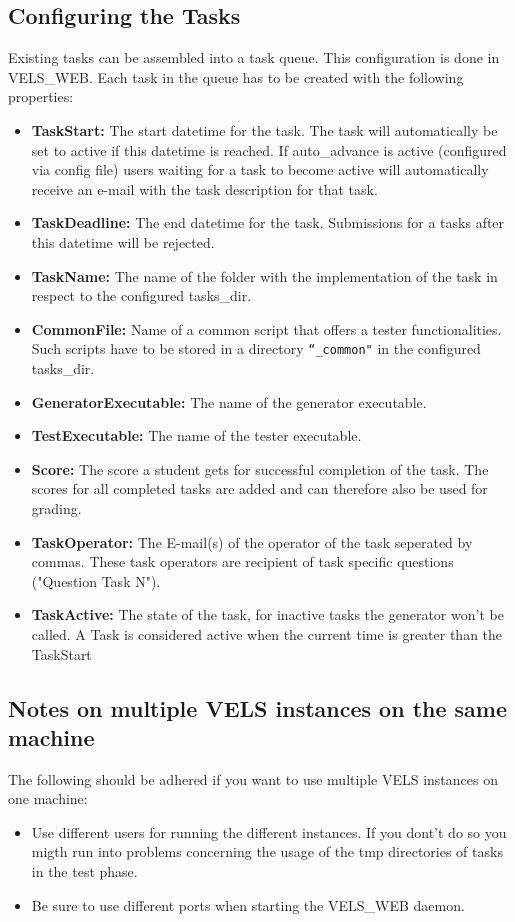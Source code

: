 \subsection{Configuring the Tasks} \label{sub:configTasks}
Existing tasks can be assembled into a task queue. This configuration is done in VELS\_WEB.
Each task in the queue has to be created with the following properties:
\begin{itemize}
\item {\bf TaskStart:} The start datetime for the task. The task will automatically
    be set to active if this datetime is reached. If auto\_advance is active (configured 
    via config file) users waiting for a task to become active will automatically 
    receive an e-mail with the task description for that task.
\item {\bf TaskDeadline:} The end datetime for the task. Submissions for a tasks after
    this datetime will be rejected.
\item {\bf TaskName:} The name of the folder with the implementation of the task in respect
	to the configured tasks\_dir.
\item {\bf CommonFile:} Name of a common script that offers a tester functionalities.
	Such scripts have to be stored in a directory {\tt ``\_common"} in the configured
	tasks\_dir.
\item {\bf GeneratorExecutable:} The name of the generator executable.
\item {\bf TestExecutable:} The name of the tester executable.
\item {\bf Score:} The score a student gets for successful completion of the task. The
    scores for all completed tasks are added and can therefore also be used for grading.
\item {\bf TaskOperator:} The E-mail(s) of the operator of the task seperated by commas. 
	These task operators are recipient of task specific questions ("Question Task N").
\item {\bf TaskActive:} The state of the task, for inactive tasks the generator won't
    be called. A Task is considered active when the current time is greater than the 
    TaskStart
\end{itemize}

\subsection{Notes on multiple VELS instances on the same machine}

The following should be adhered if you want to use multiple VELS instances on
one machine:
\begin{itemize}
\item Use different users for running the different instances. If you dont't do
	so you migth run into problems concerning the usage of the tmp directories of
	tasks in the test phase.
\item Be sure to use different ports when starting the VELS\_WEB daemon.
\end{itemize}

